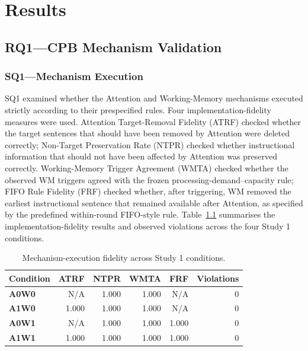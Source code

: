 \chapter{Results} \label{Chap4}
\sloppy

\section{RQ1---CPB Mechanism Validation}
\label{sec:rq1-results}

\subsection{SQ1---Mechanism Execution}
\label{subsec:rq1-sq1}

SQ1 examined whether the Attention and Working-Memory mechanisms executed strictly according to their prespecified rules. Four implementation-fidelity measures were used. Attention Target-Removal Fidelity (ATRF) checked whether the target sentences that should have been removed by Attention were deleted correctly; Non-Target Preservation Rate (NTPR) checked whether instructional information that should not have been affected by Attention was preserved correctly. Working-Memory Trigger Agreement (WMTA) checked whether the observed WM triggers agreed with the frozen processing-demand--capacity rule; FIFO Rule Fidelity (FRF) checked whether, after triggering, WM removed the earliest instructional sentence that remained available after Attention, as specified by the predefined within-round FIFO-style rule. Table~\ref{tab:rq1-mechanism-fidelity} summarises the implementation-fidelity results and observed violations across the four Study 1 conditions.

\begin{table}[H]
\centering
\caption{Mechanism-execution fidelity across Study 1 conditions.}
\label{tab:rq1-mechanism-fidelity}
\small
\setlength{\tabcolsep}{8pt}
\renewcommand{\arraystretch}{1.15}
\begin{tabular}{lrrrrr}
\toprule
\textbf{Condition} & \textbf{ATRF} & \textbf{NTPR} & \textbf{WMTA} & \textbf{FRF} & \textbf{Violations} \\
\midrule
\textbf{A0W0} & N/A & 1.000 & 1.000 & N/A & 0 \\
\textbf{A1W0} & 1.000 & 1.000 & 1.000 & N/A & 0 \\
\textbf{A0W1} & N/A & 1.000 & 1.000 & 1.000 & 0 \\
\textbf{A1W1} & 1.000 & 1.000 & 1.000 & 1.000 & 0 \\
\bottomrule
\end{tabular}
\end{table}

